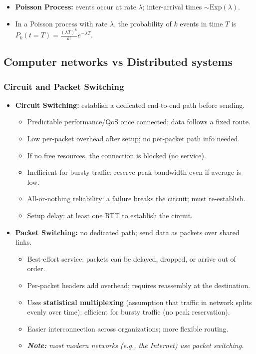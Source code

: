 \begin{itemize}
    \item \textbf{Poisson Process:} events occur at rate $\lambda$; inter-arrival times $\sim \mathrm{Exp}(\lambda)$.
    \item In a Poisson process with rate $\lambda$, the probability of $k$ events in time $T$ is $P_k(t=T)=\frac{(\lambda T)^k}{k!}e^{-\lambda T}$.
\end{itemize}

\subsection{Computer networks vs Distributed systems}
\subsubsection{Circuit and Packet Switching}
\begin{itemize}
    \item \textbf{Circuit Switching:} establish a dedicated end-to-end path before sending.
    \begin{itemize}
        \item Predictable performance/QoS once connected; data follows a fixed route.
        \item Low per-packet overhead after setup; no per-packet path info needed.
        \item If no free resources, the connection is blocked (no service).
        \item Inefficient for bursty traffic: reserve peak bandwidth even if average is low.
        \item All-or-nothing reliability: a failure breaks the circuit; must re-establish.
        \item Setup delay: at least one RTT to establish the circuit.
    \end{itemize}
    \item \textbf{Packet Switching:} no dedicated path; send data as packets over shared links.
    \begin{itemize}
        \item Best-effort service; packets can be delayed, dropped, or arrive out of order.
        \item Per-packet headers add overhead; requires reassembly at the destination.
        \item Uses \textbf{statistical multiplexing} (assumption that traffic in network splits evenly over time): efficient for bursty traffic (no peak reservation).
        \item Easier interconnection across organizations; more flexible routing.
        \item[] \textit{\textbf{Note:} most modern networks (e.g., the Internet) use packet switching.}
    \end{itemize}
\end{itemize}
